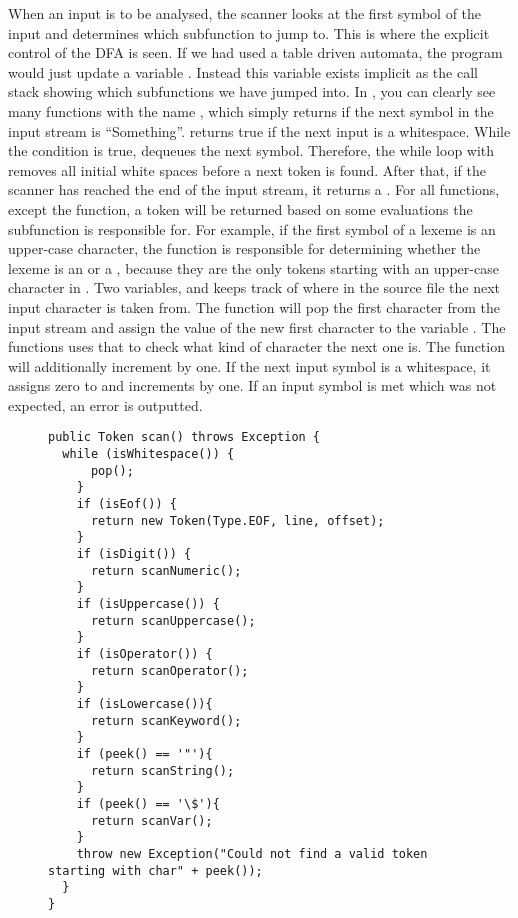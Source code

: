 When an input is to be analysed, the scanner looks at the first symbol of the input and determines which subfunction to jump to. 
This is where the explicit control of the DFA is seen. If we had used a table driven automata, the program would just update a variable . 
Instead this variable exists implicit as the call stack showing which subfunctions we have jumped into. In , you can clearly see many functions with the name , which simply returns if the next symbol in the input stream is ``Something''.  returns true if the next input is a whitespace.
While the condition is true,  dequeues the next symbol. Therefore, the while loop with  removes all initial white spaces before a next token is found. After that, if the scanner has reached the end of the input stream, it returns a . 
For all  functions, except the  function, a token will be returned based on some evaluations the subfunction is responsible for.
For example, if the first symbol of a lexeme is an upper-case character, the function  is responsible for determining whether the lexeme is an  or a , because they are the only tokens starting with an upper-case character in \productname{}. Two variables,   and   keeps track of where in the source file the next input character is taken from. The function  will pop the first character from the input stream and assign the value of the new first character to the variable . The  functions uses that  to check what kind of character the next one is.
The  function will additionally increment  by one. If the next input symbol is a whitespace, it assigns zero to   and increments  by one. If an input symbol is met which was not expected, an error is outputted.
\begin{figure}
\begin{lstlisting}
public Token scan() throws Exception {
  while (isWhitespace()) {
      pop();
    }
    if (isEof()) {
      return new Token(Type.EOF, line, offset);
    }
    if (isDigit()) {
      return scanNumeric();
    }
    if (isUppercase()) {
      return scanUppercase();
    }
    if (isOperator()) {
      return scanOperator();
    }
    if (isLowercase()){
      return scanKeyword();
    }
    if (peek() == '"'){
      return scanString();
    }
    if (peek() == '\$'){
      return scanVar();
    }
    throw new Exception("Could not find a valid token starting with char" + peek());
  }
}
\end{lstlisting}
\label{lst:scan}
\end{figure}
